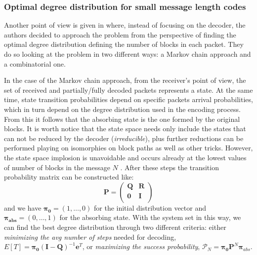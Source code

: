 \subsubsection{Optimal degree distribution for small message length codes}
Another point of view is given in \cite{Hyytia2007} where, instead of focusing on the decoder, the authors decided to approach the problem from the perspective of finding the optimal degree distribution defining the number of blocks in each packet. They do so looking at the problem in two different ways: a Markov chain approach and a combinatorial one.

In the case of the Markov chain approach, from the receiver's point of view, the set of received and partially/fully decoded packets represents a state. At the same time, state transition probabilities depend on specific packets arrival probabilities, which in turn depend on the degree distribution used in the encoding process. From this it follows that the absorbing state is the one formed by the original blocks. It is worth notice that the state space needs only include the states that can not be reduced by the decoder (\textit{irreducible}), plus further reductions can be performed playing on isomorphies on block paths as well as other tricks. However, the state space implosion is unavoidable and occurs already at the lowest values of number of blocks in the message $N$ \cite{Hyytia2007}. After these steps the transition probability matrix can be constructed like:
\begin{equation}
  \textbf{P} =
  \begin{pmatrix}
    \boldsymbol{Q} & \boldsymbol{R}\\
    \boldsymbol{0} & \boldsymbol{I}\\
  \end{pmatrix}
\end{equation}
and we have $\boldsymbol{\pi_0} = (1,\dots,0)$ for the initial distribution vector and $\boldsymbol{\pi_{abs}} = (0,\dots,1)$ for the absorbing state. With the system set in this way, we can find the best degree distribution through two different criteria: either \textit{minimizing the avg number of steps} needed for decoding, $E[T]=\boldsymbol{\pi_0}(\boldsymbol{I}-\boldsymbol{Q})^{-1}\boldsymbol{e}^T$, or \textit{maximizing the success probability}, $\mathcal{P}_N = \boldsymbol{\pi_0 P}^N\boldsymbol{\pi}_{abs}$.

